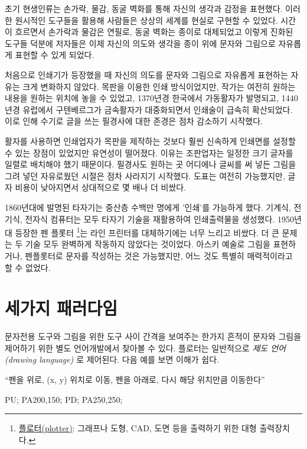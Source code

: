 \documentclass[
  letterpaper,
]{book}
\newenvironment{Shaded}{\begin{snugshade}}{\end{snugshade}}
\newcommand{\AttributeTok}[1]{\textcolor[rgb]{0.40,0.45,0.13}{#1}}
\begin{document}
초기 현생인류는 손가락, 물감, 동굴 벽화를 통해 자신의 생각과 감정을
표현했다. 이러한 원시적인 도구들을 활용해 사람들은 상상의 세계를 현실로
구현할 수 있었다. 시간이 흐르면서 손가락과 물감은 연필로, 동굴 벽화는
종이로 대체되었고 이렇게 진화된 도구들 덕분에 저자들은 이제 자신의
의도와 생각을 종이 위에 문자와 그림으로 자유롭게 표현할 수 있게 되었다.

처음으로 인쇄기가 등장했을 때 자신의 의도를 문자와 그림으로 자유롭게
표현하는 자유는 크게 변화하지 않았다. 목판을 이용한 인쇄 방식이었지만,
작가는 여전히 원하는 내용을 원하는 위치에 놓을 수 있었고, 1370년경
한국에서 가동활자가 발명되고, 1440년경 유럽에서 구텐베르그가 금속활자가
대중화되면서 인쇄술이 급속히 확산되었다. 이로 인해 수기로 글을 쓰는
필경사에 대한 존경은 점차 감소하기 시작했다.

활자를 사용하면 인쇄업자가 목판을 제작하는 것보다 훨씬 신속하게 인쇄면를
설정할 수 있는 장점이 있었지만 유연성이 떨어졌다. 이유는 조판업자는
일정한 크기 글자를 일렬로 배치해야 했기 때문이다. 필경사도 원하는 곳
어디에나 글씨를 써 넣든 그림을 그려 넣던 자유로웠던 시절은 점차 사라지기
시작했다. 도표는 여전히 가능했지만, 글자 비용이 낮아지면서 상대적으로 몇
배나 더 비쌌다.

1860년대에 발명된 타자기는 중산층 수백만 명에게 '인쇄'를 가능하게 했다.
기계식, 전기식, 전자식 컴퓨터는 모두 타자기 기술을 재활용하여
인쇄출력물을 생성했다. 1950년대 등장한 펜 플롯터 \footnote{\href{https://ko.wikipedia.org/wiki/플로터}{플로터(plotter)}:
  그래프나 도형, CAD, 도면 등을 출력하기 위한 대형 출력장치다.}는 라인
프린터를 대체하기에는 너무 느리고 비쌌다. 더 큰 문제는 두 기술 모두
완벽하게 작동하지 않았다는 것이었다. 아스키 예술로 그림을 표현하거나,
펜플롯터로 문자를 작성하는 것은 가능했지만, 어느 것도 특별히
매력적이라고 할 수 없었다.

\hypertarget{uxc138uxac00uxc9c0-uxd328uxb7ecuxb2e4uxc784}{%
\section{세가지
패러다임}\label{uxc138uxac00uxc9c0-uxd328uxb7ecuxb2e4uxc784}}

문자전용 도구와 그림을 위한 도구 사이 간격을 보여주는 한가지 흔적이
문자와 그림을 제어하기 위한 별도 언어개발에서 찾아볼 수 있다. 플로터는
일반적으로 \emph{제도 언어(drawing language)} 로 제어된다. 다음 예를
보면 이해가 쉽다.

``펜을 위로, (x, y) 위치로 이동, 펜을 아래로, 다시 해당 위치만큼
이동한다''

\begin{Shaded}
\begin{Highlighting}[]
\AttributeTok{PU;}
\AttributeTok{PA200,150;}
\AttributeTok{PD;}
\AttributeTok{PA250,250;}
\end{Highlighting}
\end{Shaded}
\end{document}
